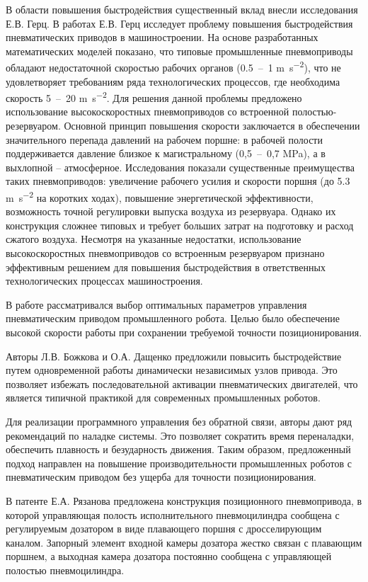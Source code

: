 В области повышения быстродействия существенный вклад внесли исследования Е.В. Герц.
В работах \cite*{герц:скоростной_привод,герц:групповой_привод} Е.В. Герц исследует проблему повышения быстродействия пневматических
приводов в машиностроении. На основе разработанных математических моделей показано, что типовые промышленные пневмоприводы обладают
недостаточной скоростью рабочих органов (\num{0.5}~--~1 \si{\metre\per\square\second}), что не удовлетворяет требованиям ряда технологических процессов,
где необходима скорость 5~--~20 \si{\metre\per\square\second}.
Для решения данной проблемы предложено использование высокоскоростных пневмоприводов со встроенной полостью-резервуаром. Основной принцип повышения скорости
заключается в обеспечении значительного перепада давлений на рабочем поршне: в рабочей полости поддерживается давление близкое
к магистральному (0,5~--~0,7 \si{\mega\pascal}), а в выхлопной – атмосферное.
Исследования показали существенные преимущества таких пневмоприводов: увеличение рабочего усилия и скорости поршня (до \num{5.3} \si{\metre\per\square\second} на коротких ходах),
повышение энергетической эффективности, возможность точной регулировки выпуска воздуха из резервуара. Однако
их конструкция сложнее типовых и требует больших затрат на подготовку и расход сжатого воздуха.
Несмотря на указанные недостатки, использование высокоскоростных пневмоприводов со встроенным резервуаром признано эффективным
решением для повышения быстродействия в ответственных технологических процессах машиностроения.

В работе \cite*{божкова:повышение_быстродействия} рассматривался выбор
оптимальных параметров управления пневматическим приводом промышленного робота.
Целью было обеспечение высокой скорости работы при сохранении требуемой точности позиционирования.

Авторы Л.В. Божкова и О.А. Дащенко предложили повысить быстродействие путем одновременной работы
динамически независимых узлов привода. Это позволяет избежать последовательной активации пневматических двигателей,
что является типичной практикой для современных промышленных роботов.

Для реализации программного управления без обратной связи, авторы дают ряд рекомендаций по наладке системы.
Это позволяет сократить время переналадки, обеспечить плавность и безударность движения. Таким образом, предложенный
подход направлен на повышение производительности промышленных
роботов с пневматическим приводом без ущерба для точности позиционирования.

В патенте Е.А. Рязанова \cite*{патент:рязанов} предложена конструкция позиционного пневмопривода,
в которой управляющая полость исполнительного пневмоцилиндра сообщена с регулируемым
дозатором в виде плавающего поршня с дросселирующим каналом. Запорный элемент входной
камеры дозатора жестко связан с плавающим поршнем, а выходная камера дозатора постоянно
сообщена с управляющей полостью пневмоцилиндра.

